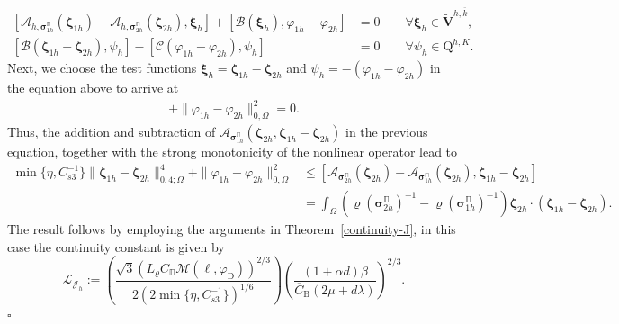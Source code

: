 \documentclass[fleqn,a4paper]{cas-sc}
\newcommand{\bxi}{\boldsymbol{\xi}}
\newcommand{\bzeta}{\boldsymbol{\zeta}}
\newcommand{\0}{\boldsymbol{0}}
\newcommand\cA{\mathcal{A}}
\newcommand\cB{\mathcal{B}}
\newcommand\cC{\mathcal{C}}
\newcommand\cJ{\mathcal{J}}
\newcommand\bV{\mathbf{V}}
\newcommand\rQ{\mathrm{Q}}
\newcommand\bbPi{\mathbb{\Pi}}
\newcommand\bsigma{\boldsymbol{\sigma}}
\numberwithin{equation}{section}
\numberwithin{figure}{section}
\newenvironment{proof}{\noindent{\it Proof.}}{\hfill$\square$}
\begin{document}
{\begin{proof}
    \begin{subequations}%
    \begin{align*}
        [\cA_{h,{\bsigma}_{1h}^\bbPi}(\bzeta_{1h}) - \cA_{h,{\bsigma}_{2h}^\bbPi}(\bzeta_{2h}), \bxi_h] + [\cB(\bxi_h), \varphi_{1h}-\varphi_{2h}] &= 0 \qquad \forall \bxi_h \in \widetilde{\bV}^{h,\overline{k}}, \\ %
        [\cB(\bzeta_{1h}-\bzeta_{2h}),  \psi_h] - [\cC(\varphi_{1h}-\varphi_{2h}), \psi_h] &= 0 \qquad \forall \psi_h \in \rQ^{h,K}. %
    \end{align*}
    \end{subequations}
Next, we choose the test functions $\bxi_h = \bzeta_{1h} - \bzeta_{2h}$ and $\psi_h = -(\varphi_{1h} - \varphi_{2h})$ in the equation above to arrive at
\begin{align*}
    [\cA_{h,{\bsigma}_{1h}^{\bbPi}}(\bzeta_{1h}) - \cA_{h,{\bsigma}_{2h}^\bbPi}(\bzeta_{2h}), \bzeta_{1h} - \bzeta_{2h}] + \|\varphi_{1h} - \varphi_{2h}\|_{0,\Omega}^2 = 0.
\end{align*}
Thus, the addition and subtraction of $\cA_{{\bsigma}_{1h}^\bbPi}(\bzeta_{2h}, \bzeta_{1h} - \bzeta_{2h})$ in the previous equation, together with the strong monotonicity of the nonlinear operator lead to
\begin{align*}
    \min\{\eta,C_{s3}^{-1}\} \|\bzeta_{1h} - \bzeta_{2h}\|_{0,4;\Omega}^4 + \|\varphi_{1h} - \varphi_{2h}\|_{0,\Omega}^2 &\leq [\cA_{{\bsigma}_{2h}^\bbPi}(\bzeta_{2h}) - \cA_{{\bsigma}_{1h}^\bbPi}(\bzeta_{2h}), \bzeta_{1h} - \bzeta_{2h}] \nonumber \\
    &= \int_\Omega \left( \varrho({\bsigma}_{2h}^\bbPi)^{-1} - \varrho({\bsigma}_{1h}^\bbPi)^{-1} \right) \bzeta_{2h} \cdot (\bzeta_{1h} - \bzeta_{2h}) .
\end{align*}
The result follows by employing the arguments in Theorem~\ref{continuity-J}, in this case the continuity constant is given by
$$\mathcal{L}_{\cJ_h}:=\left(\frac{\sqrt{3} (L_\varrho C_\bbPi \mathcal{M}(\ell, \varphi_{\mathrm{D}}))^{2/3}}{2(2\min\{\eta,C_{s3}^{-1}\})^{1/6}}\right) \left(\frac{(1+\alpha d)\beta}{\overline{C}_{\mathrm{B}}(2\mu + d\lambda)}\right)^{2/3}.$$
\end{proof}}
 
\end{document}

